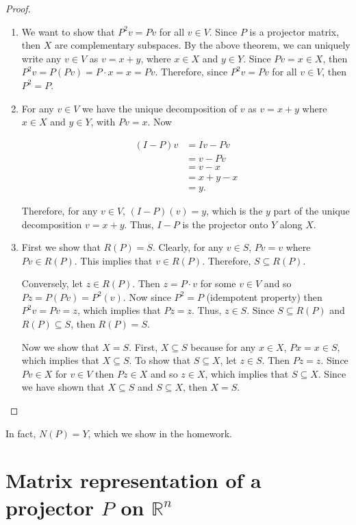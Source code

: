\documentclass[12pt]{article}
\theoremstyle{definition}
\begin{document}
\begin{proof}
\begin{enumerate}[label = (\arabic*)]
\item We want to show that $P^2 v = Pv$ for all $v \in V$. Since $P$ is a projector matrix,
then $X$ are complementary subspaces. By the above theorem, we can uniquely write any $v \in V$
as $v = x + y$, where $x \in X$ and $y \in Y$. Since $Pv = x \in X$, then 
$P^2 v = P(Pv) = P \cdot x = x = Pv$. Therefore, since $P^2 v = P v$ for all $v \in V$,
then $P^2 = P$.

\item For any $v \in V$ we have the unique decomposition of $v$ as $v = x + y$ where $x \in X$
and $y \in Y$, with $Pv = x$. Now

\begin{align*}
(I - P)v &= Iv - Pv \\
&= v - Pv \\
&= v - x \\
&= x + y - x \\
&= y.
\end{align*}

Therefore, for any $v \in V$, $(I - P)(v) = y$, which is the $y$ part of the unique decomposition
$v = x + y$. Thus, $I - P$ is the projector onto $Y$ along $X$.

\item First we show that $R(P) = S$. Clearly, for any $v \in S$, $Pv = v$ where $Pv \in R(P)$.
This implies that $v \in R(P)$. Therefore, $S \subseteq R(P)$.

Conversely, let $z \in R(P)$. Then $z = P \cdot v$ for some $v \in V$ and so
$Pz = P(Pv) = P^2 (v)$. Now since $P^2 = P$ (idempotent property) then $P^2 v = Pv = z$, which
implies that $Pz = z$. Thus, $z \in S$. Since $S \subseteq R(P)$ and $R(P) \subseteq S$, then
$R(P) = S$.

Now we show that $X = S$. First, $X \subseteq S$ because for any $x \in X$, $Px = x \in S$,
which implies that $X \subseteq S$. To show that $S \subseteq X$, let $z \in S$. Then $Pz = z$.
Since $Pv \in X$ for $v \in V$ then $Pz \in X$ and so $z \in X$, which implies that $S \subseteq X$.
Since we have shown that $X \subseteq S$ and $S \subseteq X$, then $X = S$.
\end{enumerate}
\end{proof}

In fact, $N(P) = Y$, which we show in the homework.

\section{Matrix representation of a projector $P$ on $\mathbb{R}^n$}
\end{document}
